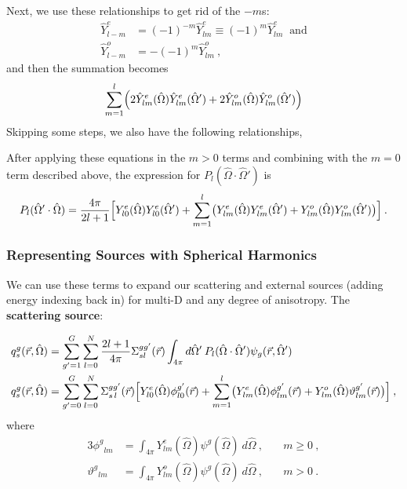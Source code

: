 \documentclass[12pt]{article}
\newcommand{\Macro}{\ensuremath{\Sigma}}
\newcommand{\vecr}{\ensuremath{\vec{r}}}
\newcommand{\vOmega}{\ensuremath{\hat{\Omega}}}
\newcommand{\even}{\ensuremath{\phi^g}}
\newcommand{\odd}{\ensuremath{\vartheta^g}}
\newcommand{\evenp}{\ensuremath{\phi^{g'}}}
\newcommand{\oddp}{\ensuremath{\vartheta^{g'}}}
\newcommand{\sigg}[1]{\ensuremath{\Macro^{gg'}_{s\,#1}}}
\begin{document}
Next, we use these relationships to get rid of the $-m$s: 
\begin{align}
 \hat{Y}^e_{l-m} &= (-1)^{-m}\hat{Y}^e_{lm} \equiv (-1)^m\hat{Y}^e_{lm} \:\text{ and}\\
 \hat{Y}^o_{l-m} &= -(-1)^m\hat{Y}^o_{lm}\:,
\end{align}
and then the summation becomes
\begin{equation}
  \sum_{m=1}^l\Bigl(
  2\hat{Y}^e_{lm}(\vOmega)\hat{Y}^e_{lm}(\vOmega') +
  2\hat{Y}^o_{lm}(\vOmega)\hat{Y}^o_{lm}(\vOmega')\Bigr)
\end{equation}
Skipping some steps, we also have the following relationships,

After applying these equations in the $m>0$ terms and combining with the $m=0$
term described above, the expression for $P_l(\vOmega\cdot\vOmega')$ is
\begin{equation}
  P_l(\vOmega'\cdot\vOmega) = \frac{4\pi}{2l+1}
  \Bigl[
  Y^e_{l0}(\vOmega)Y^e_{l0}(\vOmega') +
  \sum_{m=1}^l
  \bigl(Y^e_{lm}(\vOmega)Y^e_{lm}(\vOmega') +
  Y^o_{lm}(\vOmega)Y^o_{lm}(\vOmega')\bigr)\Bigr]\:.
    \label{eq:P_l(mu_o)}
\end{equation}

\subsubsection*{Representing Sources with Spherical Harmonics}
We can use these terms to expand our scattering and external sources (adding energy indexing back in) for multi-D and any degree of anisotropy. The \textbf{scattering source}:

\begin{align}
q^g_{s}(\vec{r},\vOmega) &= \sum_{g'=1}^G \sum_{l=0}^{N} \frac{2l+1}{4 \pi} \Sigma^{gg'}_{sl}(\vecr) \int_{4\pi} d\vOmega'\: P_l(\vOmega \cdot \vOmega') \psi_g(\vecr, \vOmega')\\
  q^g_{s}(\vec{r},\vOmega) &= \sum_{g'=0}^G
  \sum_{l=0}^N
  \sigg{l}(\vec{r})
  \Bigl[
  Y^e_{l0}(\vOmega)\evenp_{l0}(\vec{r}) +
  \sum_{m=1}^l
  \bigl(
  Y^e_{lm}(\vOmega)\evenp_{lm}(\vec{r}) +
  Y^o_{lm}(\vOmega)\oddp_{lm}(\vec{r})
  \bigr)\Bigr]\:,
  \label{eq:mg-scattering-source}
\end{align}
where
\begin{alignat}{3}
  \even_{lm} &= \int_{4\pi}Y^e_{lm}(\vOmega)\psi^g(\vOmega)\:d\vOmega\:,
  \quad& m\ge 0\:,\label{eq:even-flux}\\
  \odd_{lm} &= \int_{4\pi}Y^o_{lm}(\vOmega)\psi^g(\vOmega)\:d\vOmega\:,
  \quad& m>0\:.\label{eq:odd-flux}
\end{alignat}
\end{document}
